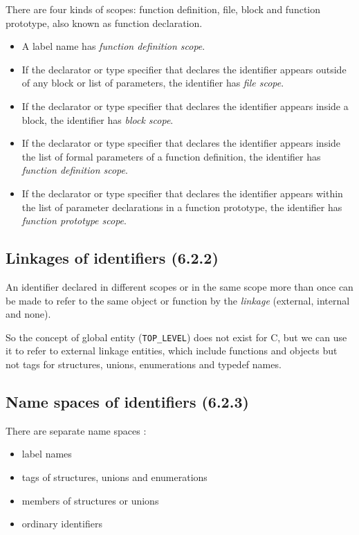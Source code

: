 \documentclass[a4paper]{report}
\begin{document}
There are four kinds of scopes: function definition, file, block and
function prototype, also known as function declaration.
\begin{itemize}
\item A label name has {\it function definition scope}.
\item If the declarator or type specifier that declares the identifier
  appears outside of any block or list of parameters, the identifier has
  {\it file scope}.
\item If the declarator or type specifier that declares the identifier
  appears inside a block, the identifier has
  {\it block scope}.
\item If the declarator or type specifier that declares the identifier
  appears inside the list of formal parameters of a function
  definition, the identifier has {\it function definition scope}.
\item If the declarator or type specifier that declares the identifier
  appears within the list of parameter declarations in a function
  prototype, the identifier has {\it function prototype scope}.
\end{itemize}

\subsection{Linkages of identifiers (6.2.2)}

An identifier declared in different scopes or in the same scope more than
once can be made to refer to the same object or function by the {\it
  linkage} (external, internal and none). 

So the concept of global entity (\verb/TOP_LEVEL/) does not exist for
C, but we can use it to refer to external linkage entities, which
include functions and objects but not tags for structures, unions,
enumerations and typedef names.

\subsection{Name spaces of identifiers (6.2.3)}

There are separate name spaces : 
\begin{itemize}
\item label names
\item tags of structures, unions and enumerations 
\item members of structures or unions
\item ordinary identifiers 
\end{itemize}
\end{document}

